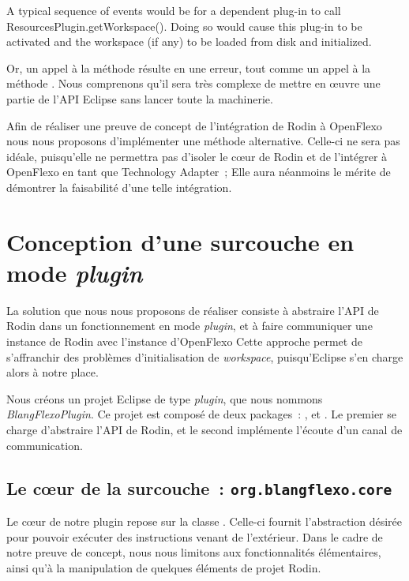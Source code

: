 \begin{imtaQuote}
A typical sequence of events would be for a dependent plug-in to call\\ResourcesPlugin.getWorkspace().
Doing so would cause this plug-in to be activated and the workspace (if any) to be loaded from disk and initialized.
\end{imtaQuote}

Or, un appel à la méthode  résulte en une erreur, tout comme un appel à la méthode .
Nous comprenons qu'il sera très complexe de mettre en œuvre une partie de l'API Eclipse sans lancer toute la machinerie.

Afin de réaliser une preuve de concept de l'intégration de Rodin à OpenFlexo nous nous proposons d'implémenter une méthode alternative.
Celle-ci ne sera pas idéale, puisqu'elle ne permettra pas d'isoler le cœur de Rodin et de l'intégrer à OpenFlexo en tant que Technology Adapter~; %
Elle aura néanmoins le mérite de démontrer la faisabilité d'une telle intégration.


\section{Conception d'une surcouche en mode \textit{plugin}}

La solution que nous nous proposons de réaliser consiste à abstraire l'API de Rodin dans un fonctionnement en mode \textit{plugin}, et à faire communiquer une instance de Rodin %
avec l'instance d'OpenFlexo
Cette approche permet de s'affranchir des problèmes d'initialisation de \textit{workspace}, puisqu'Eclipse s'en charge alors à notre place.

Nous créons un projet Eclipse de type \textit{plugin}, que nous nommons \textit{BlangFlexoPlugin}.
Ce projet est composé de deux packages~: , et .
Le premier se charge d'abstraire l'API de Rodin, et le second implémente l'écoute d'un canal de communication.

\subsection{Le cœur de la surcouche~: \texttt{org.blangflexo.core}}

Le cœur de notre plugin repose sur la classe .
Celle-ci fournit l'abstraction désirée pour pouvoir exécuter des instructions venant de l'extérieur.
Dans le cadre de notre preuve de concept, nous nous limitons aux fonctionnalités élémentaires, ainsi qu'à la manipulation de quelques éléments de projet Rodin.

